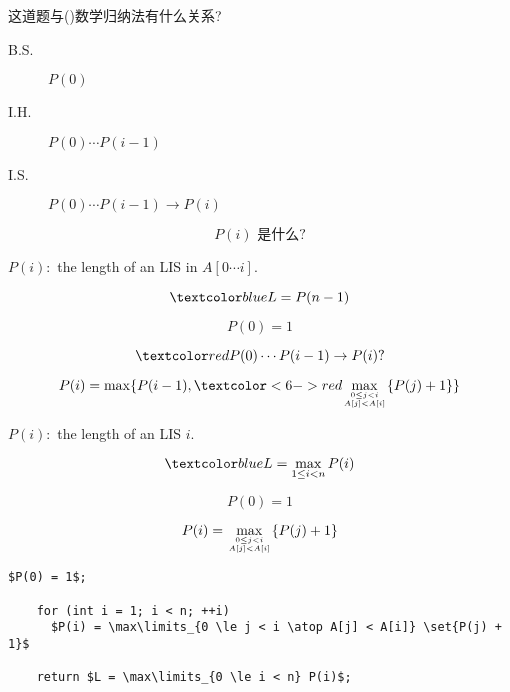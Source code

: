 \begin{frame}{}
  \centerline{ 这道题与()数学归纳法有什么关系?}

  \vspace{0.30cm}
  \pause
  \begin{description}
    \item[B.S.] $P(0)$
    \item[I.H.] $P(0) \cdots P(i-1)$
    \item[I.S.] $P(0) \cdots P(i-1) \to P(i)$
  \end{description}

  \pause
  \[
    P(i) \text{ 是什么?}
  \]
\end{frame}

\begin{frame}{}
  \centerline{$P(i):$ the length of an LIS in $A[0 \cdots i]$.}

  \pause
  \[
    \blue{L = P(n-1)}
  \]

  \pause
  \[
    P(0) = 1
  \]

  \pause
  \[
    \red{P(0) \cdots P(i-1) \to P(i)?}
  \]

  \pause
  \[
    P(i) = \max\set{P(i-1), \redoverlay{\max_{0 \le j < i \atop A[j] < A[i]} \set{P(j) + 1}}{6-}}
  \]
  
\end{frame}

\begin{frame}{}
  \centerline{$P(i):$ the length of an LIS  $i$.}

  \pause
  \[
    \blue{L = \max_{1 \le i < n} P(i)}
  \]

  \pause
  \[
    P(0) = 1
  \]

  \pause
  \[
    P(i) = \max_{0 \le j < i \atop A[j] < A[i]} \{P(j) + 1\}
  \]

\end{frame}

\begin{frame}[fragile]{}
  \begin{lstlisting}[style = Cstyle]
    $P(0) = 1$;

    for (int i = 1; i < n; ++i)
      $P(i) = \max\limits_{0 \le j < i \atop A[j] < A[i]} \set{P(j) + 1}$

    return $L = \max\limits_{0 \le i < n} P(i)$;
  \end{lstlisting}



  \pause
\end{frame}
